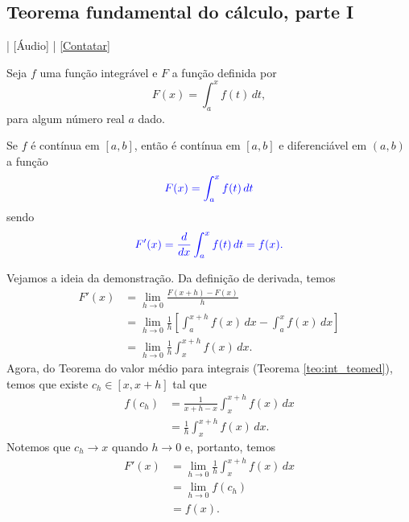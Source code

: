 \subsection{Teorema fundamental do cálculo, parte I}

\begin{flushright}
  [Vídeo] | [Áudio] | \href{https://phkonzen.github.io/notas/contato.html}{[Contatar]}
\end{flushright}

Seja $f$ uma função integrável e $F$ a função definida por
\begin{equation}
  F(x) = \int_a^x f(t)\,dt,
\end{equation}
para algum número real $a$ dado.

\begin{teo}\label{teo:int_tfc1}
  Se $f$ é contínua em $[a, b]$, então é contínua em $[a, b]$ e diferenciável em $(a, b)$ a função
  \begin{equation}\color{blue}F(x) = \int_a^x f(t)\,dt
  \end{equation}
  sendo
  \begin{equation}\color{blue}F'(x) = \frac{d}{dx}\int_a^x f(t)\,dt = f(x).
  \end{equation}
\end{teo}
\begin{dem}
  Vejamos a ideia da demonstração. Da definição de derivada, temos
  \begin{align}
    F'(x) &= \lim_{h\to 0} \frac{F(x+h) - F(x)}{h} \\
          &= \lim_{h\to 0} \frac{1}{h}\left[\int_a^{x+h} f(x)\,dx - \int_a^x f(x)\, dx\right] \\
          &= \lim_{h\to 0} \frac{1}{h}\int_x^{x+h} f(x)\,dx.
  \end{align}
  Agora, do Teorema do valor médio para integrais (Teorema \ref{teo:int_teomed}), temos que existe $c_h \in [x, x+h]$ tal que
  \begin{align}
    f(c_h) &= \frac{1}{x+h-x}\int_x^{x+h} f(x)\,dx \\
           &= \frac{1}{h}\int_x^{x+h} f(x)\,dx.
  \end{align}
  Notemos que $c_h\to x$ quando $h\to 0$ e, portanto, temos
  \begin{align}
    F'(x) &= \lim_{h\to 0} \frac{1}{h}\int_x^{x+h} f(x)\,dx \\
          &= \lim_{h\to 0} f(c_h) \\
          &= f(x).
  \end{align}
\end{dem}

